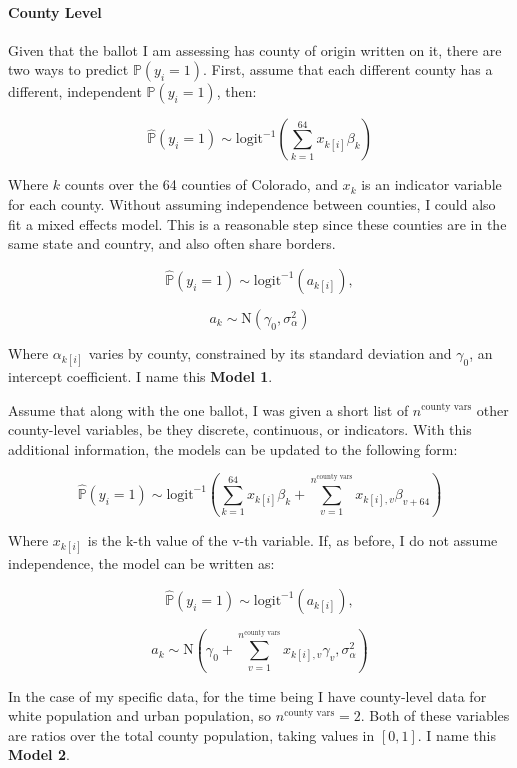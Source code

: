 \documentclass[]{article}
\let\oldparagraph\paragraph
\renewcommand{\paragraph}[1]{\oldparagraph{#1}\mbox{}}
\begin{document}
\paragraph{County Level}\label{county-level}

Given that the ballot I am assessing has county of origin written on it,
there are two ways to predict \(\mathbb{P}(y_i = 1)\). First, assume
that each different county has a different, independent
\(\mathbb{P}(y_i = 1)\), then:

\[\hat{\mathbb{P}}(y_i = 1) \sim \text{logit}^{-1}(\sum_{k = 1}^{64}x_{k[i]}\beta_{k})\]

Where \(k\) counts over the 64 counties of Colorado, and \(x_{k}\) is an
indicator variable for each county. Without assuming independence
between counties, I could also fit a mixed effects model. This is a
reasonable step since these counties are in the same state and country,
and also often share borders.

\begin{equation} \tag{Model 1}
\hat{\mathbb{P}}(y_i = 1) \sim \text{logit}^{-1}(a_{k[i]}),
\end{equation}

\[a_{k} \sim \text{N}(\gamma_0, \sigma_{\alpha}^2)\]

Where \(\alpha_{k[i]}\) varies by county, constrained by its standard
deviation and \(\gamma_0\), an intercept coefficient. I name this
\textbf{Model 1}.

Assume that along with the one ballot, I was given a short list of
\(n^{\text{county vars}}\) other county-level variables, be they
discrete, continuous, or indicators. With this additional information,
the models can be updated to the following form:

\[\hat{\mathbb{P}}(y_i = 1) \sim \text{logit}^{-1}(\sum_{k = 1}^{64}x_{k[i]}\beta_{k} + \sum_{v=1}^{n^{\text{county vars}}}x_{k[i], v}\beta_{v+64})\]

Where \(x_{k[i]}\) is the k-th value of the v-th variable. If, as
before, I do not assume independence, the model can be written as:

\begin{equation} \tag{Model 2}  
\hat{\mathbb{P}}(y_i = 1) \sim \text{logit}^{-1}(a_{k[i]}),
\end{equation}

\[a_{k} \sim \text{N}(\gamma_0 + \sum_{v=1}^{n^{\text{county vars}}}x_{k[i], v}\gamma_{v}, \sigma_{\alpha}^2)\]

In the case of my specific data, for the time being I have county-level
data for white population and urban population, so
\(n^{\text{county vars}} = 2\). Both of these variables are ratios over
the total county population, taking values in \([0,1]\). I name this
\textbf{Model 2}.
\end{document}
